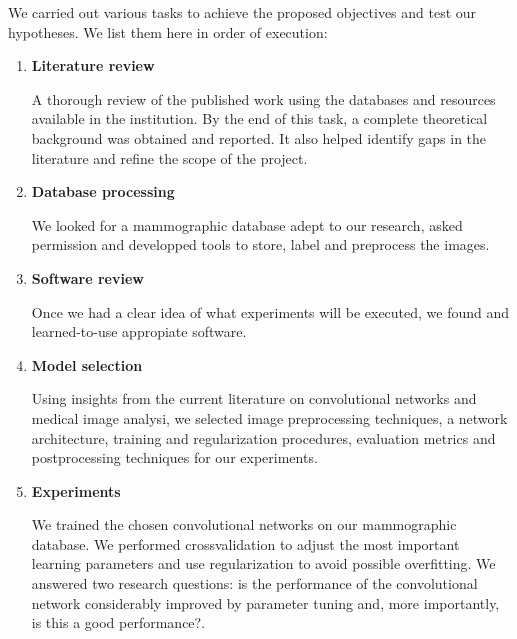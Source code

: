 We carried out various tasks to achieve the proposed objectives and test our hypotheses. We list them here in order of execution:
\begin{enumerate}
	\item \textbf{Literature review}

A thorough review of the published work using the databases and resources available in the institution. By the end of this task, a complete theoretical background was obtained and reported. It also helped identify gaps in the literature and refine the scope of the project.
	\item \textbf{Database processing}

We looked for a mammographic database adept to our research, asked permission and developped tools to store, label and preprocess the images.
	\item \textbf{Software review}

Once we had a clear idea of what experiments will be executed, we found and learned-to-use appropiate software. 

\begin{comment}
	\item \textbf{Exploratory experiments}

We will train a standard convolutional networks with fixed parameters for the detection of microcalcifications and the detection of masses. We want to answer whether the convolutional network is powerful enough to learn the task in hand, whether we have enough data for the network to learn or more data augmentation is needed and wether the computational resources and parameter settings allow the network to learn in a timely fashion.
\end{comment}
	\item \textbf{Model selection}

Using insights from the current literature on convolutional networks and medical image analysi, we selected image preprocessing techniques, a network architecture, training and regularization procedures, evaluation metrics and postprocessing techniques for our experiments.
	\item \textbf{Experiments}
	
We trained the chosen convolutional networks on our mammographic database. We performed crossvalidation to adjust the most important learning parameters and use regularization to avoid possible overfitting. We answered two research questions: is the performance of the convolutional network considerably improved by parameter tuning and, more importantly, is this a good performance?.
	

\end{enumerate}
